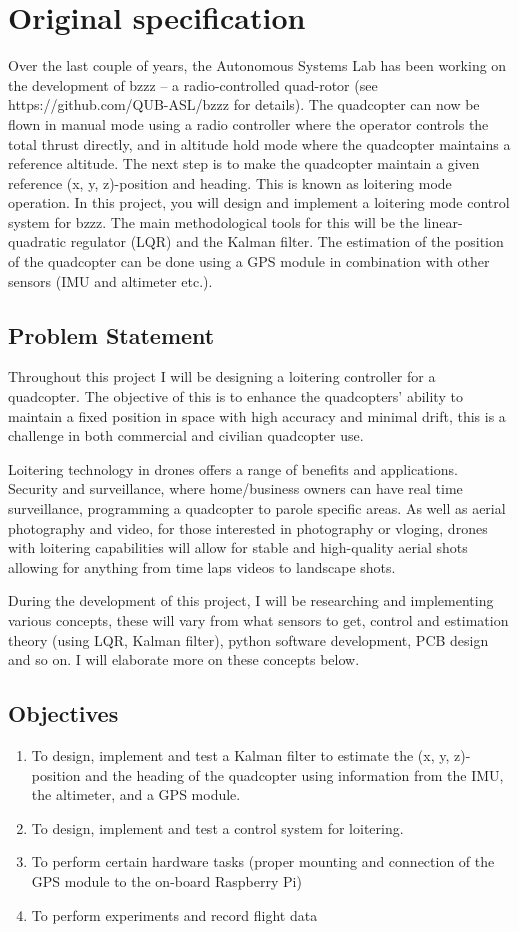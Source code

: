 \documentclass{article}
\begin{document}
\section*{Original specification}
Over the last couple of years, the Autonomous Systems Lab has been working on
the development of bzzz – a radio-controlled quad-rotor (see
https://github.com/QUB-ASL/bzzz for details). The quadcopter can now be flown in
manual mode using a radio controller where the operator controls the total
thrust directly, and in altitude hold mode where the quadcopter maintains a
reference altitude. The next step is to make the quadcopter maintain a given
reference (x, y, z)-position and heading. This is known as loitering mode
operation. In this project, you will design and implement a loitering mode
control system for bzzz. The main methodological tools for this will be the
linear-quadratic regulator (LQR) and the Kalman filter. The estimation of the
position of the quadcopter can be done using a GPS module in combination with
other sensors (IMU and altimeter etc.).
\subsection*{Problem Statement}
Throughout this project I will be designing a loitering controller for a
quadcopter. The objective of this is to enhance the quadcopters' ability to
maintain a fixed position in space with high accuracy and minimal drift, this is
a challenge in both commercial and civilian quadcopter use.

Loitering technology in drones offers a range of benefits and applications.
Security and surveillance, where home/business owners can have real time
surveillance, programming a quadcopter to parole specific areas. As well as
aerial photography and video, for those interested in photography or vloging,
drones with loitering capabilities will allow for stable and high-quality aerial
shots allowing for anything from time laps videos to landscape shots.

During the development of this project, I will be researching and implementing
various concepts, these will vary from what sensors to get, control and
estimation theory (using LQR, Kalman filter), python software development, PCB
design and so on. I will elaborate more on these concepts below.

\newpage
\subsection*{Objectives}
\begin{enumerate}
    \item To design, implement and test a Kalman filter to estimate the (x, y,
    z)-	position and the heading of the quadcopter using information from the
    IMU, the altimeter, and a GPS module.
    \item To design, implement and test a control system for loitering.
    \item To perform certain hardware tasks (proper mounting and connection of
    the GPS module to the on-board Raspberry Pi)
    \item To perform experiments and record flight data
\end{enumerate}
\end{document}
